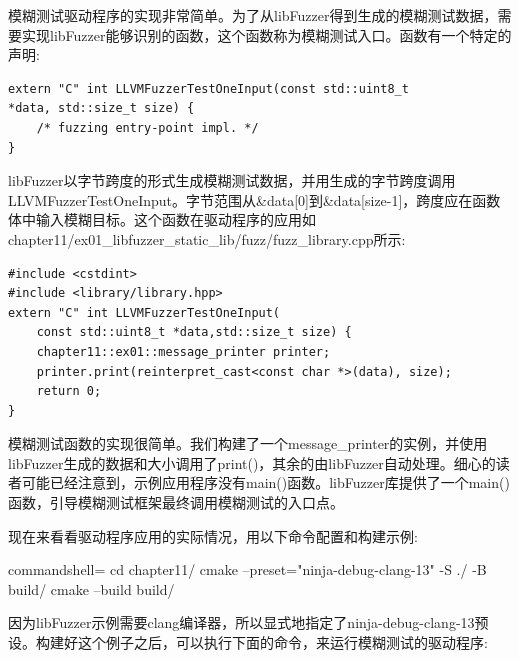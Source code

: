 模糊测试驱动程序的实现非常简单。为了从libFuzzer得到生成的模糊测试数据，需要实现libFuzzer能够识别的函数，这个函数称为模糊测试入口。函数有一个特定的声明:

\begin{lstlisting}[style=styleCXX]
extern "C" int LLVMFuzzerTestOneInput(const std::uint8_t
*data, std::size_t size) {
	/* fuzzing entry-point impl. */
}
\end{lstlisting}

libFuzzer以字节跨度的形式生成模糊测试数据，并用生成的字节跨度调用LLVMFuzzerTestOneInput。字节范围从\&data[0]到\&data[size-1]，跨度应在函数体中输入模糊目标。这个函数在驱动程序的应用如chapter11/ex01\_libfuzzer\_static\_lib/fuzz/fuzz\_library.cpp所示:

\begin{lstlisting}[style=styleCXX]
#include <cstdint>
#include <library/library.hpp>
extern "C" int LLVMFuzzerTestOneInput(
	const std::uint8_t *data,std::size_t size) {
	chapter11::ex01::message_printer printer;
	printer.print(reinterpret_cast<const char *>(data), size);
	return 0;
}
\end{lstlisting}

模糊测试函数的实现很简单。我们构建了一个message\_printer的实例，并使用libFuzzer生成的数据和大小调用了print()，其余的由libFuzzer自动处理。细心的读者可能已经注意到，示例应用程序没有main()函数。libFuzzer库提供了一个main()函数，引导模糊测试框架最终调用模糊测试的入口点。

现在来看看驱动程序应用的实际情况，用以下命令配置和构建示例:

\begin{tcblisting}{commandshell={}}
cd chapter11/
cmake --preset="ninja-debug-clang-13" -S ./ -B build/
cmake --build build/
\end{tcblisting}

因为libFuzzer示例需要clang编译器，所以显式地指定了ninja-debug-clang-13预设。构建好这个例子之后，可以执行下面的命令，来运行模糊测试的驱动程序:

